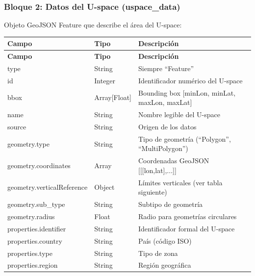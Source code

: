 \documentclass[12pt,a4paper]{article}
\begin{document}
\subsubsection{Bloque 2: Datos del U-space (uspace\_data)}
Objeto GeoJSON Feature que describe el área del U-space:

\begin{longtable}{|p{4cm}|p{2.5cm}|p{8.5cm}|}
\hline
\textbf{Campo} & \textbf{Tipo} & \textbf{Descripción} \\
\hline
\endfirsthead
\hline
\textbf{Campo} & \textbf{Tipo} & \textbf{Descripción} \\
\hline
\endhead
\hline
\endfoot
\hline
\endlastfoot
type & String & Siempre ``Feature'' \\
\hline
id & Integer & Identificador numérico del U-space \\
\hline
bbox & Array[Float] & Bounding box [minLon, minLat, maxLon, maxLat] \\
\hline
name & String & Nombre legible del U-space \\
\hline
source & String & Origen de los datos \\
\hline
geometry.type & String & Tipo de geometría (``Polygon'', ``MultiPolygon'') \\
\hline
geometry.coordinates & Array & Coordenadas GeoJSON [[[lon,lat],...]] \\
\hline
geometry.verticalReference & Object & Límites verticales (ver tabla siguiente) \\
\hline
geometry.sub\_type & String & Subtipo de geometría \\
\hline
geometry.radius & Float & Radio para geometrías circulares \\
\hline
properties.identifier & String & Identificador formal del U-space \\
\hline
properties.country & String & País (código ISO) \\
\hline
properties.type & String & Tipo de zona \\
\hline
properties.region & String & Región geográfica \\
\hline
\end{longtable}
\end{document}
